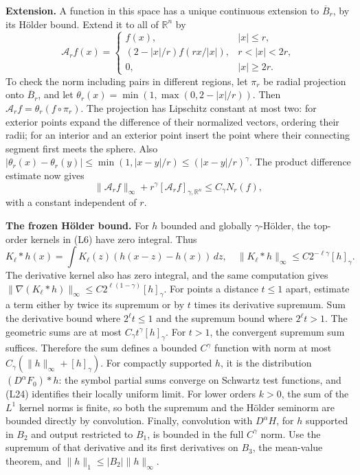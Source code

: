 \documentclass[
  11pt,
]{article}
\begin{document}
\textbf{Extension.} A function in this space has a unique continuous
extension to \(\overline B_r\), by its Hölder bound. Extend it to all of
\(\mathbb R^n\) by \[
\mathcal A_rf(x)=
\begin{cases}
f(x),&|x|\leq r,\\
(2-|x|/r)f(rx/|x|),&r<|x|<2r,\\
0,&|x|\geq2r.
\end{cases}                                                       \tag{L22}
\] To check the norm including pairs in different regions, let \(\pi_r\)
be radial projection onto \(\overline B_r\), and let
\(\theta_r(x)=\min(1,\max(0,2-|x|/r))\). Then
\(\mathcal A_rf=\theta_r(f\circ\pi_r)\). The projection has Lipschitz
constant at most two: for exterior points expand the difference of their
normalized vectors, ordering their radii; for an interior and an
exterior point insert the point where their connecting segment first
meets the sphere. Also
\(|\theta_r(x)-\theta_r(y)|\leq\min(1,|x-y|/r)\leq(|x-y|/r)^\gamma\).
The product difference estimate now gives \[
\|\mathcal A_rf\|_\infty+r^\gamma[\mathcal A_rf]_{\gamma,\mathbb R^n}
\leq C_\gamma N_r(f),                                             \tag{L23}
\] with a constant independent of \(r\).

\textbf{The frozen Hölder bound.} For \(h\) bounded and globally
\(\gamma\)-Hölder, the top-order kernels in (L6) have zero integral.
Thus \[
K_\ell*h(x)=\int K_\ell(z)(h(x-z)-h(x))\,dz,
\quad
\|K_\ell*h\|_\infty\leq C2^{-\ell\gamma}[h]_\gamma.                \tag{L24}
\] The derivative kernel also has zero integral, and the same
computation gives
\(\|\nabla(K_\ell*h)\|_\infty\leq C2^{\ell(1-\gamma)}[h]_\gamma\). For
points a distance \(t\leq1\) apart, estimate a term either by twice its
supremum or by \(t\) times its derivative supremum. Sum the derivative
bound where \(2^\ell t\leq1\) and the supremum bound where
\(2^\ell t>1\). The geometric sums are at most
\(C_\gamma t^\gamma[h]_\gamma\). For \(t>1\), the convergent supremum
sum suffices. Therefore the sum defines a bounded \(C^\gamma\) function
with norm at most \(C_\gamma(\|h\|_\infty+[h]_\gamma)\). For compactly
supported \(h\), it is the distribution \((D^\alpha F_0)*h\): the symbol
partial sums converge on Schwartz test functions, and (L24) identifies
their locally uniform limit. For lower orders \(k>0\), the sum of the
\(L^1\) kernel norms is finite, so both the supremum and the Hölder
seminorm are bounded directly by convolution. Finally, convolution with
\(D^\alpha H\), for \(h\) supported in \(B_2\) and output restricted to
\(B_1\), is bounded in the full \(C^\gamma\) norm. Use the supremum of
that derivative and its first derivatives on \(B_3\), the mean-value
theorem, and \(\|h\|_1\leq|B_2|\|h\|_\infty\).
\end{document}
